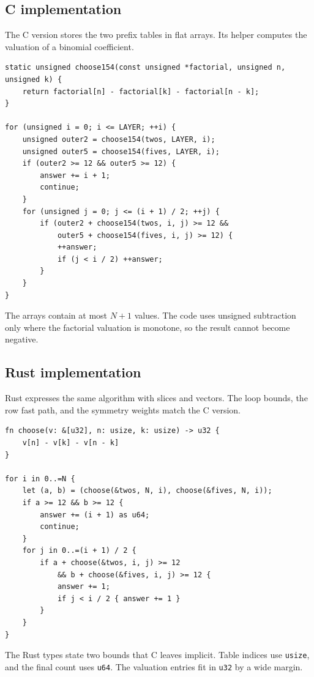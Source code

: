 \subsection{C implementation}

The C version stores the two prefix tables in flat arrays. Its helper computes
the valuation of a binomial coefficient.

\begin{lstlisting}
static unsigned choose154(const unsigned *factorial, unsigned n, unsigned k) {
    return factorial[n] - factorial[k] - factorial[n - k];
}

for (unsigned i = 0; i <= LAYER; ++i) {
    unsigned outer2 = choose154(twos, LAYER, i);
    unsigned outer5 = choose154(fives, LAYER, i);
    if (outer2 >= 12 && outer5 >= 12) {
        answer += i + 1;
        continue;
    }
    for (unsigned j = 0; j <= (i + 1) / 2; ++j) {
        if (outer2 + choose154(twos, i, j) >= 12 &&
            outer5 + choose154(fives, i, j) >= 12) {
            ++answer;
            if (j < i / 2) ++answer;
        }
    }
}
\end{lstlisting}

The arrays contain at most $N+1$ values. The code uses unsigned subtraction
only where the factorial valuation is monotone, so the result cannot become
negative.

\subsection{Rust implementation}

Rust expresses the same algorithm with slices and vectors. The loop bounds,
the row fast path, and the symmetry weights match the C version.

\begin{lstlisting}
fn choose(v: &[u32], n: usize, k: usize) -> u32 {
    v[n] - v[k] - v[n - k]
}

for i in 0..=N {
    let (a, b) = (choose(&twos, N, i), choose(&fives, N, i));
    if a >= 12 && b >= 12 {
        answer += (i + 1) as u64;
        continue;
    }
    for j in 0..=(i + 1) / 2 {
        if a + choose(&twos, i, j) >= 12
            && b + choose(&fives, i, j) >= 12 {
            answer += 1;
            if j < i / 2 { answer += 1 }
        }
    }
}
\end{lstlisting}

The Rust types state two bounds that C leaves implicit. Table indices use
\texttt{usize}, and the final count uses \texttt{u64}. The valuation entries fit
in \texttt{u32} by a wide margin.

